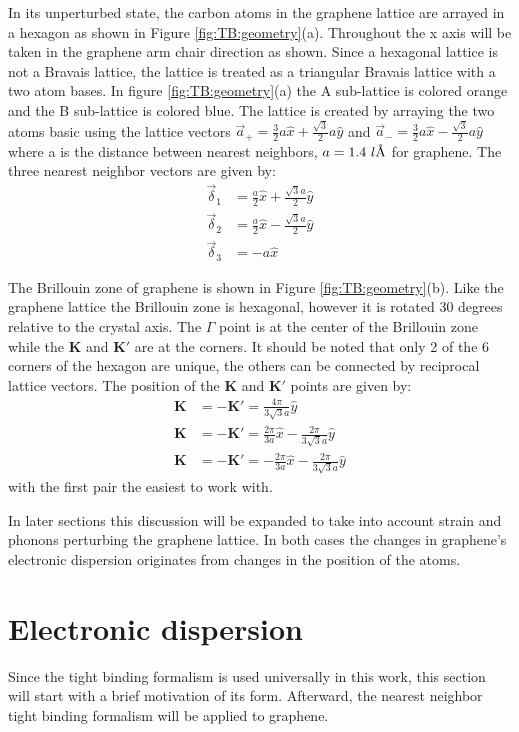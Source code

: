 In its unperturbed state, the carbon atoms in the graphene lattice are arrayed in a hexagon as shown in Figure \ref{fig:TB:geometry}(a).
Throughout the x axis will be taken in the graphene arm chair direction as shown.
Since a hexagonal lattice is not a Bravais lattice, the lattice is treated as a triangular Bravais lattice with a two atom bases.
In figure \ref{fig:TB:geometry}(a) the A sub-lattice is colored orange and the B sub-lattice is colored blue.
The lattice is created by arraying the two atoms basic using the lattice vectors $\vec{a}_+=\frac{3}{2} a \hat{x}+\frac{\sqrt{3}}{2} a \hat{y}$ and $\vec{a}_-=\frac{3}{2} a \hat{x}-\frac{\sqrt{3}}{2} a \hat{y}$ where a is the distance between nearest neighbors, $a=1.4 \ l\textup{\AA}$ for graphene.
The three nearest neighbor vectors are given by:
\begin{align*}
	\vec \delta_1&=\frac{a}{2}\hat{x}+\frac{\sqrt{3} a}{2}\hat{y}\\
	\vec \delta_2&=\frac{a}{2}\hat{x}-\frac{\sqrt{3} a}{2}\hat{y}\\
	\vec \delta_3&=-a \hat{x}
\end{align*}

The Brillouin zone of graphene is shown in Figure \ref{fig:TB:geometry}(b).
Like the graphene lattice the Brillouin zone is hexagonal, however it is rotated 30 degrees relative to the crystal axis.
The $\Gamma$ point is at the center of the Brillouin zone while the $\bm{K}$ and $\bm{K'}$ are at the corners.
It should be noted that only 2 of the 6 corners of the hexagon are unique, the others can be connected by reciprocal lattice vectors.
The position of the $\bm{K}$ and $\bm{K'}$ points are given by:
\begin{align*}
	\bm{K}&=-\bm{K'}=\frac{4 \pi}{3 \sqrt{3} a} \hat{y} \\
	\bm{K}&=-\bm{K'}= \frac{2 \pi}{3 a} \hat{x}-\frac{2 \pi}{3 \sqrt{3} a} \hat{y} \\
	\bm{K}&=-\bm{K'}=-\frac{2 \pi}{3 a} \hat{x}-\frac{2 \pi}{3 \sqrt{3} a} \hat{y}
\end{align*}
with the first pair the easiest to work with.

In later sections this discussion will be expanded to take into account strain and phonons perturbing the graphene lattice.
In both cases the changes in graphene's electronic dispersion originates from changes in the position of the atoms.

\section{Electronic dispersion}
Since the tight binding formalism is used universally in this work, this section will start with a brief motivation of its form.
Afterward, the nearest neighbor tight binding formalism will be applied to graphene.

